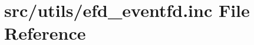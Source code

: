 \hypertarget{efd__eventfd_8inc}{}\section{src/utils/efd\+\_\+eventfd.inc File Reference}
\label{efd__eventfd_8inc}
